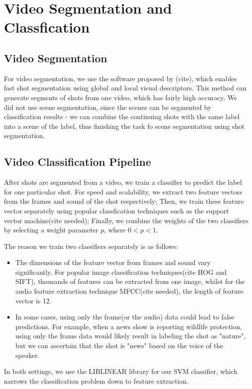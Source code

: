 \section{Video Segmentation and Classfication}
\subsection{Video Segmentation}
For video segmentation, we use the software proposed by (cite), which enables fast shot segmentation using global and local visual descriptors. This method can generate segments of shots from one video, which has fairly high accuracy. We did not use scene segmentation, since the scenes can be segmented by classification results - we can combine the continuing shots with the same label into a scene of the label, thus finishing the task fo scene segmentation using shot segmentation.
\subsection{Video Classification Pipeline}
After shots are segmented from a video, we train a classifier to predict the label for one particular shot. For speed and scalability, we extract two feature vectors from the frames and sound of the shot respectively; Then, we train these feature vector separately using popular classfication techniques such as the support vector machine(cite needed); Finally, we combine the weights of the two classifiers by selecting a weight parameter $p$, where $0 < p < 1$. \par
The reason we train two classifiers separately is as follows:
\begin{itemize}
\item The dimensions of the feature vector from frames and sound vary significantly. For popular image classification techniques(cite HOG and SIFT), thousands of features can be extracted from one image, whilst for the audio feature extraction technique MFCC(cite needed), the length of feature vector is 12.
\item In some cases, using only the frame(or the audio) data could lead to false predictions. For example, when a news show is reporting wildlife protection, using only the frame data would likely result in labeling the shot as "nature", but we can ascertain that the shot is "news" based on the voice of the speaker.
\end{itemize}
In both settings, we use the LIBLINEAR library for our SVM classifier, which narrows the classification problem down to feature extraction.
